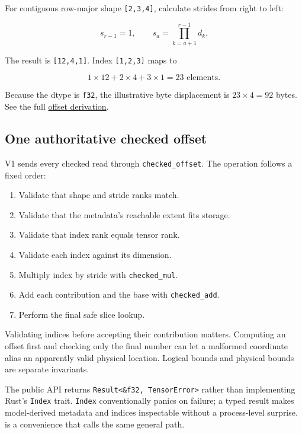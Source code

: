 \documentclass[
  10pt,
]{article}
\providecommand{\tightlist}{%
  \setlength{\itemsep}{0pt}\setlength{\parskip}{0pt}}
\begin{document}
For contiguous row-major shape \texttt{{[}2,3,4{]}}, calculate strides
from right to left:

\[
s_{r-1}=1,
\qquad
s_a=\prod_{k=a+1}^{r-1}d_k.
\]

The result is \texttt{{[}12,4,1{]}}. Index \texttt{{[}1,2,3{]}} maps to

\[
1\times12 + 2\times4 + 3\times1 = 23\text{ elements}.
\]

Because the dtype is \texttt{f32}, the illustrative byte displacement is
\(23\times4=92\) bytes. See the full
\href{https://github.com/hermonai/inside-the-llm-engine/blob/astra-visual-rewrite/diagrams/tensor/row-major-offsets.txt}{offset
derivation}.

\subsection{One authoritative checked
offset}\label{one-authoritative-checked-offset}

V1 sends every checked read through \texttt{checked\_offset}. The
operation follows a fixed order:

\begin{enumerate}
\def\labelenumi{\arabic{enumi}.}
\tightlist
\item
  Validate that shape and stride ranks match.
\item
  Validate that the metadata's reachable extent fits storage.
\item
  Validate that index rank equals tensor rank.
\item
  Validate each index against its dimension.
\item
  Multiply index by stride with \texttt{checked\_mul}.
\item
  Add each contribution and the base with \texttt{checked\_add}.
\item
  Perform the final safe slice lookup.
\end{enumerate}

Validating indices before accepting their contribution matters.
Computing an offset first and checking only the final number can let a
malformed coordinate alias an apparently valid physical location.
Logical bounds and physical bounds are separate invariants.

The public API returns
\texttt{Result\textless{}\&f32,\ TensorError\textgreater{}} rather than
implementing Rust's \texttt{Index} trait. \texttt{Index} conventionally
panics on failure; a typed result makes model-derived metadata and
indices inspectable without a process-level surprise.
\texttt{} is a convenience that calls the
same general path.
\end{document}
